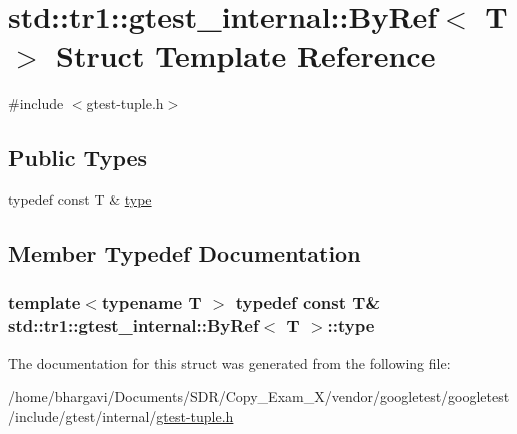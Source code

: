 \hypertarget{structstd_1_1tr1_1_1gtest__internal_1_1_by_ref}{}\section{std\+:\+:tr1\+:\+:gtest\+\_\+internal\+:\+:By\+Ref$<$ T $>$ Struct Template Reference}
\label{structstd_1_1tr1_1_1gtest__internal_1_1_by_ref}


{\ttfamily \#include $<$gtest-\/tuple.\+h$>$}

\subsection*{Public Types}
\begin{DoxyCompactItemize}
\item 
typedef const T \& \hyperlink{structstd_1_1tr1_1_1gtest__internal_1_1_by_ref_ac42ad942ee1cfa86b2abcce9b88ac10e}{type}
\end{DoxyCompactItemize}


\subsection{Member Typedef Documentation}
\subsubsection[{\texorpdfstring{type}{type}}]{\setlength{\rightskip}{0pt plus 5cm}template$<$typename T $>$ typedef const T\& {\bf std\+::tr1\+::gtest\+\_\+internal\+::\+By\+Ref}$<$ T $>$\+::{\bf type}}\hypertarget{structstd_1_1tr1_1_1gtest__internal_1_1_by_ref_ac42ad942ee1cfa86b2abcce9b88ac10e}{}\label{structstd_1_1tr1_1_1gtest__internal_1_1_by_ref_ac42ad942ee1cfa86b2abcce9b88ac10e}


The documentation for this struct was generated from the following file\+:\begin{DoxyCompactItemize}
\item 
/home/bhargavi/\+Documents/\+S\+D\+R/\+Copy\+\_\+\+Exam\+\_\+X/vendor/googletest/googletest/include/gtest/internal/\hyperlink{gtest-tuple_8h}{gtest-\/tuple.\+h}\end{DoxyCompactItemize}
